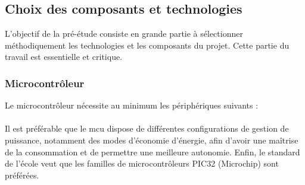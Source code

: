 \begin{table}[h]
\end{table}

\clearpage
\raggedbottom
\subsection{Choix des composants et technologies} \label{sssec:ComposantsTech}
L'objectif de la pré-étude consiste en grande partie à sélectionner méthodiquement les technologies et les composants du projet. Cette partie du travail est essentielle et critique.

\subsubsection{Microcontrôleur}
Le microcontrôleur nécessite au minimum les périphériques suivants : \\
   \\
Il est préférable que le \gls{mcu} dispose de différentes configurations de gestion de puissance, notamment des modes d'économie d'énergie, afin d'avoir une maîtrise de la consommation et de permettre une meilleure autonomie. Enfin, le standard de l'école veut que les familles de microcontrôleurs PIC32 (Microchip) sont préférées.

